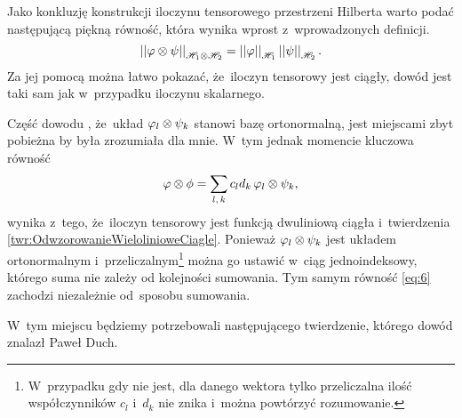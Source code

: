 \documentclass[a4paper,11pt]{article}
\begin{document}

\vspace{\spaceFour}



\start {} Jako konkluzję konstrukcji iloczynu tensorowego
przestrzeni Hilberta warto podać następującą piękną równość, która
wynika wprost z~wprowadzonych definicji.
\begin{equation*}
  \left|\left|  \varphi \otimes \psi  \right|\right|_{ \mathcal{H}_{ 1 } \otimes \mathcal{H}_{ 2 } }
  = \left|\left|  \varphi  \right|\right|_{ \mathcal{H}_{ 1 } } \left|\left|  \psi  \right|\right|_{ \mathcal{H}_{ 2 } }.
\end{equation*}
Za jej pomocą można łatwo pokazać, że~iloczyn tensorowy jest ciągły,
dowód jest taki sam jak w~przypadku iloczynu skalarnego. %

\vspace{\spaceFour}



\start {} Część dowodu , że~układ
$\varphi_{ l } \otimes \psi_{ k }$ stanowi bazę ortonormalną, jest miejscami
zbyt pobieżna by była zrozumiała dla mnie. W~tym jednak momencie
kluczowa równość
\begin{equation}
  \label{eq:6}
  \varphi \otimes \phi = \sum\limits_{ l,\, k } c_{ l } d_{ k }\, \varphi_{ l } \otimes \psi_{ k },
\end{equation}
wynika z~tego, że~iloczyn tensorowy jest funkcją dwuliniową ciągła
i~twierdzenia \eqref{twr:OdwzorowanieWielolinioweCiagle}. Ponieważ
$\varphi_{ l } \otimes \psi_{ k }$ jest układem ortonormalnym
i~przeliczalnym\footnote{W~przypadku gdy nie jest, dla danego wektora
  tylko przeliczalna ilość współczynników $c_{ l }$ i~$d_{ k }$ nie
  znika i~można powtórzyć rozumowanie.} można go ustawić w~ciąg
jednoindeksowy, którego suma nie zależy od kolejności sumowania. Tym
samym równość \eqref{eq:6} zachodzi niezależnie od~sposobu sumowania.

\vspace{\spaceFour}



\start {} W~tym miejscu będziemy potrzebowali następującego
twierdzenie, którego dowód znalazł Paweł Duch.
\end{document}
